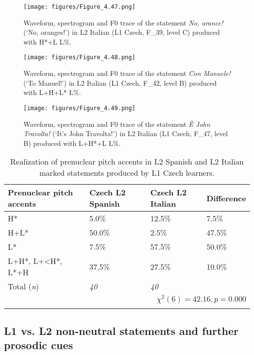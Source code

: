 \begin{figure}
\texttt{[image: figures/Figure\_4.47.png]}
\caption{Waveform, spectrogram and F0 trace of the statement \textit{No, arance!} (‘No, oranges!’) in L2 Italian (L1 Czech, F\_39, level C) produced with H*+L L\%.}
\label{fig:4.47}
\end{figure}

\begin{figure}
\texttt{[image: figures/Figure\_4.48.png]}
\caption{Waveform, spectrogram and F0 trace of the statement \textit{Con Manuele!} (‘To Manuel!’) in L2 Italian (L1 Czech, F\_42, level B) produced with L+H+L* L\%.}
\label{fig:4.48}
\end{figure}

\begin{figure}
\texttt{[image: figures/Figure\_4.49.png]}
\caption{Waveform, spectrogram and F0 trace of the statement \textit{È John Travolta!} (‘It’s John Travolta!’) in L2 Italian (L1 Czech, F\_47, level B) produced with L+H*+L L\%.}
\label{fig:4.49}
\end{figure}


\begin{table}
\begin{tabularx}{\textwidth}{lYYY}

\lsptoprule

{Prenuclear pitch accents} & {Czech L2 Spanish} & {Czech L2 Italian} & {Difference}\\
\midrule
H* &  5.0\% &  12.5\% &  7.5\%\\
H+L* &  50.0\% &  2.5\% &  47.5\%\\
L* &  7.5\% &  57.5\% &  50.0\%\\
L+H*, L+<H*, L*+H &  37.5\% &  27.5\% &  10.0\%\\
\midrule
Total (\textit{n}) & {\itshape 40} & {\itshape 40} &  \\
\\
\lspbottomrule
\end{tabularx}

\caption{Realization of prenuclear pitch accents in L2 Spanish and L2 Italian marked statements produced by L1 Czech learners.}
\label{tab:4.16}
\end{table}

\subsection{L1 vs. L2 non-neutral statements and further prosodic cues}\label{sec:4.2.4}

